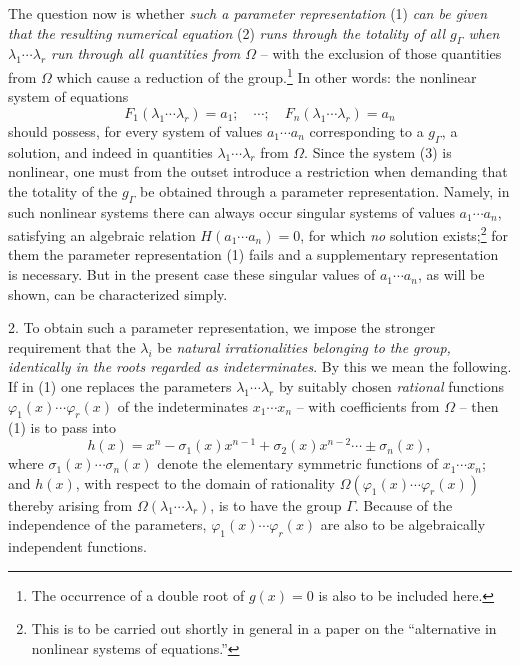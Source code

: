 \documentclass[11pt]{article}
\begin{document}
The question now is whether \emph{such a parameter representation} (1) \emph{can be given that the resulting numerical equation} (2) \emph{runs through the totality of all $g_\Gamma$ when $\lambda_1\cdots\lambda_r$ run through all quantities from $\Omega$} -- with the exclusion of those quantities from $\Omega$ which cause a reduction of the group.\footnote{The occurrence of a double root of $g(x)=0$ is also to be included here.} In other words: the nonlinear system of equations
\begin{equation}
 F_1(\lambda_1\cdots\lambda_r)=a_1;\quad \cdots;\quad F_n(\lambda_1\cdots\lambda_r)=a_n
\tag{3}
\end{equation}
should possess, for every system of values $a_1\cdots a_n$ corresponding to a $g_\Gamma$, a solution, and indeed in quantities $\lambda_1\cdots\lambda_r$ from $\Omega$. Since the system (3) is nonlinear, one must from the outset introduce a restriction when demanding that the totality of the $g_\Gamma$ be obtained through a parameter representation. Namely, in such nonlinear systems there can always occur singular systems of values $a_1\cdots a_n$, satisfying an algebraic relation $H(a_1\cdots a_n)=0$, for which \emph{no} solution exists;\footnote{This is to be carried out shortly in general in a paper on the ``alternative in nonlinear systems of equations.''} for them the parameter representation (1) fails and a supplementary representation is necessary. But in the present case these singular values of $a_1\cdots a_n$, as will be shown, can be characterized simply.

2. To obtain such a parameter representation, we impose the stronger requirement that the $\lambda_i$ be \emph{natural irrationalities belonging to the group, identically in the roots regarded as indeterminates}. By this we mean the following. If in (1) one replaces the parameters $\lambda_1\cdots\lambda_r$ by suitably chosen \emph{rational} functions $\varphi_1(x)\cdots\varphi_r(x)$ of the indeterminates $x_1\cdots x_n$ -- with coefficients from $\Omega$ -- then (1) is to pass into
\begin{equation}
 h(x)=x^n-\sigma_1(x)x^{n-1}+\sigma_2(x)x^{n-2}\cdots\pm\sigma_n(x),
\tag{4}
\end{equation}
where $\sigma_1(x)\cdots\sigma_n(x)$ denote the elementary symmetric functions of $x_1\cdots x_n$; and $h(x)$, with respect to the domain of rationality $\Omega(\varphi_1(x)\cdots\varphi_r(x))$ thereby arising from $\Omega(\lambda_1\cdots\lambda_r)$, is to have the group $\Gamma$. Because of the independence of the parameters, $\varphi_1(x)\cdots\varphi_r(x)$ are also to be algebraically independent functions.
\end{document}
